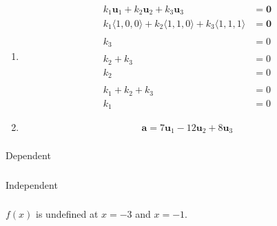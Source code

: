 \documentclass{article}
\begin{document}
\begin{enumerate}
  \item

        \begin{align*}
          k_1 \mathbf{u}_1 + k_2 \mathbf{u}_2 + k_3 \mathbf{u}_3                                  & = \mathbf{0} \\
          k_1 \langle 1, 0, 0 \rangle + k_2 \langle 1, 1, 0 \rangle + k_3 \langle 1, 1, 1 \rangle & = \mathbf{0} \\ \\
          k_3                                                                                     & = 0          \\ \\
          k_2 + k_3                                                                               & = 0          \\
          k_2                                                                                     & = 0          \\ \\
          k_1 + k_2 + k_3                                                                         & = 0          \\
          k_1                                                                                     & = 0
        \end{align*}

  \item \[\mathbf{a} = 7 \mathbf{u}_1 - 12 \mathbf{u}_2 + 8 \mathbf{u}_3\]
\end{enumerate}

\setcounter{subsubsection}{24}
\subsubsection{}

Dependent

\setcounter{subsubsection}{26}
\subsubsection{}

Independent

\setcounter{subsubsection}{28}
\subsubsection{}

$f(x)$ is undefined at $x = -3$ and $x = -1$.
\end{document}
